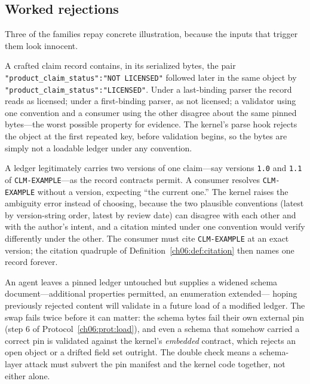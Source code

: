 \subsection{Worked rejections}

Three of the families repay concrete illustration, because the inputs
that trigger them look innocent.

\begin{example}\label{ch06:ex:dupkey}
A crafted claim record contains, in its serialized bytes, the pair
\texttt{"product\_claim\_status":"NOT LICENSED"} followed later in the
same object by \texttt{"product\_claim\_status":"LICENSED"}. Under a
last-binding parser the record reads as licensed; under a first-binding
parser, as not licensed; a validator using one convention and a
consumer using the other disagree about the same pinned bytes---the
worst possible property for evidence. The kernel's parse hook rejects
the object at the first repeated key, before validation begins, so the
bytes are simply not a loadable ledger under any convention.
\end{example}

\begin{example}\label{ch06:ex:ambiguous}
A ledger legitimately carries two versions of one claim---say versions
\texttt{1.0} and \texttt{1.1} of \texttt{CLM-EXAMPLE}---as the record
contracts permit. A consumer resolves \texttt{CLM-EXAMPLE} without a
version, expecting ``the current one.'' The kernel raises the ambiguity
error instead of choosing, because the two plausible conventions
(latest by version-string order, latest by review date) can disagree
with each other and with the author's intent, and a citation minted
under one convention would verify differently under the other. The
consumer must cite \texttt{CLM-EXAMPLE} at an exact version; the
citation quadruple of Definition~\ref{ch06:def:citation} then names one
record forever.
\end{example}

\begin{example}\label{ch06:ex:schemaswap}
An agent leaves a pinned ledger untouched but supplies a widened schema
document---additional properties permitted, an enumeration extended---
hoping previously rejected content will validate in a future load of a
modified ledger. The swap fails twice before it can matter: the schema
bytes fail their own external pin (step 6 of
Protocol~\ref{ch06:prot:load}), and even a schema that somehow carried
a correct pin is validated against the kernel's \emph{embedded}
contract, which rejects an open object or a drifted field set outright.
The double check means a schema-layer attack must subvert the pin
manifest and the kernel code together, not either alone.
\end{example}

